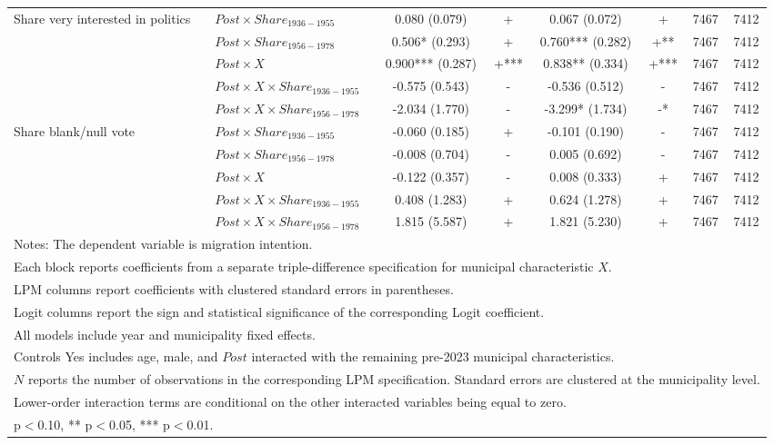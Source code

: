 \begin{table}[!htbp]
\begin{tabular}{llcccccc}
\addlinespace
Share very interested in politics & $Post \times Share_{1936-1955}$ & 0.080 (0.079) & + & 0.067 (0.072) & + & 7467 & 7412 \\
 & $Post \times Share_{1956-1978}$ & 0.506* (0.293) & + & 0.760*** (0.282) & +** & 7467 & 7412 \\
 & $Post \times X$ & 0.900*** (0.287) & +*** & 0.838** (0.334) & +*** & 7467 & 7412 \\
 & $Post \times X \times Share_{1936-1955}$ & -0.575 (0.543) & - & -0.536 (0.512) & - & 7467 & 7412 \\
 & $Post \times X \times Share_{1956-1978}$ & -2.034 (1.770) & - & -3.299* (1.734) & -* & 7467 & 7412 \\
\addlinespace
Share blank/null vote & $Post \times Share_{1936-1955}$ & -0.060 (0.185) & + & -0.101 (0.190) & - & 7467 & 7412 \\
 & $Post \times Share_{1956-1978}$ & -0.008 (0.704) & - & 0.005 (0.692) & - & 7467 & 7412 \\
 & $Post \times X$ & -0.122 (0.357) & - & 0.008 (0.333) & + & 7467 & 7412 \\
 & $Post \times X \times Share_{1936-1955}$ & 0.408 (1.283) & + & 0.624 (1.278) & + & 7467 & 7412 \\
 & $Post \times X \times Share_{1956-1978}$ & 1.815 (5.587) & + & 1.821 (5.230) & + & 7467 & 7412 \\
\hline
\multicolumn{8}{l}{\footnotesize Notes: The dependent variable is migration intention.} \\
\multicolumn{8}{l}{\footnotesize Each block reports coefficients from a separate triple-difference specification for municipal characteristic $X$.} \\
\multicolumn{8}{l}{\footnotesize LPM columns report coefficients with clustered standard errors in parentheses.} \\
\multicolumn{8}{l}{\footnotesize Logit columns report the sign and statistical significance of the corresponding Logit coefficient.} \\
\multicolumn{8}{l}{\footnotesize All models include year and municipality fixed effects.} \\
\multicolumn{8}{l}{\footnotesize Controls Yes includes age, male, and $Post$ interacted with the remaining pre-2023 municipal characteristics.} \\
\multicolumn{8}{l}{\footnotesize $N$ reports the number of observations in the corresponding LPM specification. Standard errors are clustered at the municipality level.} \\
\multicolumn{8}{l}{\footnotesize Lower-order interaction terms are conditional on the other interacted variables being equal to zero.} \\
\multicolumn{8}{l}{\footnotesize * p$<$0.10, ** p$<$0.05, *** p$<$0.01.} \\
\end{tabular}
\end{table}
